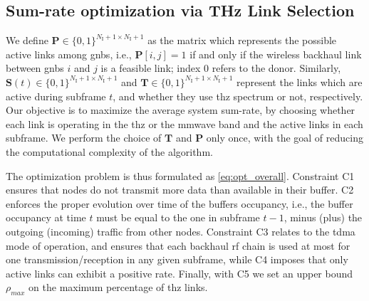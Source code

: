 
\subsection{Sum-rate optimization via THz Link Selection}
\label{sub:THzLinkSel}

We define $\bm{P} \in \{0, 1\}^{N_{\mathrm{I}} + 1 \times N_{\mathrm{I}} + 1}$ as the matrix which represents the possible active links among \glspl{gnb}, i.e., $\bm{P} [i, j] = 1$ if and only if the wireless backhaul link between \glspl{gnb} $i$ and $j$ is a feasible link; index $0$ refers to the donor. Similarly, $\bm{S} (t) \in \{0, 1\}^{N_{\mathrm{I}} + 1 \times N_{\mathrm{I}} + 1}$ and $\bm{T} \in \{0, 1\}^{N_{\mathrm{I}} + 1 \times N_{\mathrm{I}} + 1}$ represent the links which are active during subframe $t$, and whether they use \gls{thz} spectrum or not, respectively. 
Our objective is to maximize the average system sum-rate, by choosing whether each link is operating in the \gls{thz} or the \gls{mmwave} band and the active links in each subframe. We perform the choice of $\bm{T}$ and $\bm{P}$ only once, with the goal of reducing the computational complexity of the algorithm.



The optimization problem is thus formulated as \eqref{eq:opt_overall}. Constraint C1 ensures that nodes do not transmit more data than available in their buffer. C2 enforces the proper evolution over time of the buffers occupancy, i.e., the buffer occupancy at time $t$ must be equal to the one in subframe $t - 1$, minus (plus) the outgoing (incoming) traffic from other nodes. Constraint C3 relates to the \gls{tdma} mode of operation, and ensures that each backhaul \gls{rf} chain is used at most for one transmission/reception in any given subframe, while C4 imposes that only active links can exhibit a positive rate. 
Finally, with C5 we set an upper bound $\rho_{max}$ on the maximum percentage of \gls{thz} links. 

